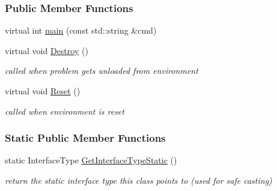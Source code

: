 \subsubsection*{Public Member Functions}
\begin{DoxyCompactItemize}
\item 
virtual int \hyperlink{classOpenRAVE_1_1ModuleBase_a9272536a00bca7f32ec0e4a7e131ac23}{main} (const std::string \&cmd)
\item 
\hypertarget{classOpenRAVE_1_1ModuleBase_a941c8e8d2c5aa963d76aef113f19d835}{
virtual void \hyperlink{classOpenRAVE_1_1ModuleBase_a941c8e8d2c5aa963d76aef113f19d835}{Destroy} ()}
\label{classOpenRAVE_1_1ModuleBase_a941c8e8d2c5aa963d76aef113f19d835}

\begin{DoxyCompactList}\small\item\em called when problem gets unloaded from environment \item\end{DoxyCompactList}\item 
\hypertarget{classOpenRAVE_1_1ModuleBase_a4c4ba0ffe635d14b93794268bd8e5995}{
virtual void \hyperlink{classOpenRAVE_1_1ModuleBase_a4c4ba0ffe635d14b93794268bd8e5995}{Reset} ()}
\label{classOpenRAVE_1_1ModuleBase_a4c4ba0ffe635d14b93794268bd8e5995}

\begin{DoxyCompactList}\small\item\em called when environment is reset \item\end{DoxyCompactList}\end{DoxyCompactItemize}
\subsubsection*{Static Public Member Functions}
\begin{DoxyCompactItemize}
\item 
\hypertarget{classOpenRAVE_1_1ModuleBase_affeafe65e7c4094f282d273dedbf069b}{
static InterfaceType \hyperlink{classOpenRAVE_1_1ModuleBase_affeafe65e7c4094f282d273dedbf069b}{GetInterfaceTypeStatic} ()}
\label{classOpenRAVE_1_1ModuleBase_affeafe65e7c4094f282d273dedbf069b}

\begin{DoxyCompactList}\small\item\em return the static interface type this class points to (used for safe casting) \item\end{DoxyCompactList}\end{DoxyCompactItemize}


